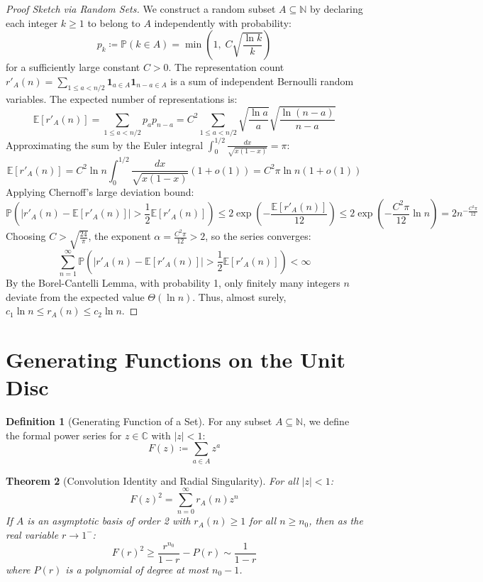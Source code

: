 \documentclass[11pt,a4paper]{article}
\newtheorem{theorem}{Theorem}[section]
\theoremstyle{definition}
\newtheorem{definition}[theorem]{Definition}
\begin{document}
\begin{proof}[Proof Sketch via Random Sets]
We construct a random subset $A \subseteq \mathbb{N}$ by declaring each integer $k \ge 1$ to belong to $A$ independently with probability:
\[ p_k \coloneqq \mathbb{P}(k \in A) = \min\left(1, \; C \sqrt{\frac{\ln k}{k}}\right) \]
for a sufficiently large constant $C > 0$.
The representation count $r'_A(n) = \sum_{1 \le a < n/2} \mathbf{1}_{a \in A} \mathbf{1}_{n-a \in A}$ is a sum of independent Bernoulli random variables.
The expected number of representations is:
\[ \mathbb{E}[r'_A(n)] = \sum_{1 \le a < n/2} p_a p_{n-a} = C^2 \sum_{1 \le a < n/2} \sqrt{\frac{\ln a}{a}} \sqrt{\frac{\ln(n-a)}{n-a}} \]
Approximating the sum by the Euler integral $\int_0^{1/2} \frac{dx}{\sqrt{x(1-x)}} = \pi$:
\[ \mathbb{E}[r'_A(n)] = C^2 \ln n \int_0^{1/2} \frac{dx}{\sqrt{x(1-x)}} (1 + o(1)) = C^2 \pi \ln n (1 + o(1)) \]
Applying Chernoff's large deviation bound:
\[ \mathbb{P}\left( |r'_A(n) - \mathbb{E}[r'_A(n)]| > \frac{1}{2} \mathbb{E}[r'_A(n)] \right) \le 2 \exp\left( - \frac{\mathbb{E}[r'_A(n)]}{12} \right) \le 2 \exp\left( - \frac{C^2 \pi}{12} \ln n \right) = 2 n^{- \frac{C^2 \pi}{12}} \]
Choosing $C > \sqrt{\frac{24}{\pi}}$, the exponent $\alpha = \frac{C^2 \pi}{12} > 2$, so the series converges:
\[ \sum_{n=1}^\infty \mathbb{P}\left( |r'_A(n) - \mathbb{E}[r'_A(n)]| > \frac{1}{2} \mathbb{E}[r'_A(n)] \right) < \infty \]
By the Borel-Cantelli Lemma, with probability 1, only finitely many integers $n$ deviate from the expected value $\Theta(\ln n)$.
Thus, almost surely, $c_1 \ln n \le r_A(n) \le c_2 \ln n$.
\end{proof}

\section{Generating Functions on the Unit Disc}

\begin{definition}[Generating Function of a Set]\label{def:gen_fn}
For any subset $A \subseteq \mathbb{N}$, we define the formal power series for $z \in \mathbb{C}$ with $|z| < 1$:
\begin{equation}\label{eq:gen_fn}
F(z) \coloneqq \sum_{a \in A} z^a
\end{equation}
\end{definition}

\begin{theorem}[Convolution Identity and Radial Singularity]\label{thm:conv_sing}
For all $|z| < 1$:
\begin{equation}\label{eq:conv_sq}
F(z)^2 = \sum_{n=0}^\infty r_A(n) z^n
\end{equation}
If $A$ is an asymptotic basis of order 2 with $r_A(n) \ge 1$ for all $n \ge n_0$, then as the real variable $r \to 1^-$:
\begin{equation}\label{eq:radial_growth}
F(r)^2 \ge \frac{r^{n_0}}{1 - r} - P(r) \sim \frac{1}{1 - r}
\end{equation}
where $P(r)$ is a polynomial of degree at most $n_0 - 1$.
\end{theorem}
\end{document}
